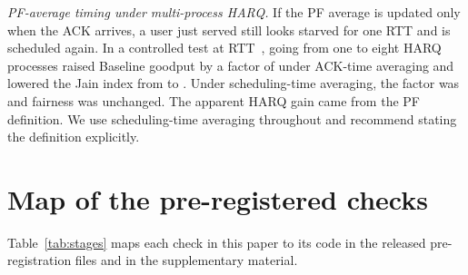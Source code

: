 \emph{PF-average timing under multi-process HARQ.} If the PF average is updated only when the ACK arrives, a user just served still looks starved for one RTT and is scheduled again. In a controlled test at RTT~\NCfgRtt{}, going from one to eight HARQ processes raised Baseline goodput by a factor of \NAsixBaseAckRatio{} under ACK-time averaging and lowered the Jain index from \NAsixJainAckOne{} to \NAsixJainAckEight. Under scheduling-time averaging, the factor was \NAsixBaseSchedRatio{} and fairness was unchanged. The apparent HARQ gain came from the PF definition. We use scheduling-time averaging throughout and recommend stating the definition explicitly.

\section{Map of the pre-registered checks}\label{app:programme}
Table~\ref{tab:stages} maps each check in this paper to its code in the released pre-registration files and in the supplementary material.

